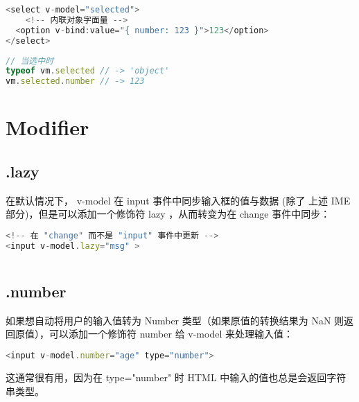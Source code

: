 \begin{lstlisting}[language=JavaScript]
<select v-model="selected">
    <!-- 内联对象字面量 -->
  <option v-bind:value="{ number: 123 }">123</option>
</select>
\end{lstlisting}



\begin{lstlisting}[language=JavaScript]
// 当选中时
typeof vm.selected // -> 'object'
vm.selected.number // -> 123
\end{lstlisting}



\section{Modifier}


\subsection{.lazy}

在默认情况下， v-model 在 input 事件中同步输入框的值与数据 (除了 上述 IME 部分)，但是可以添加一个修饰符 lazy ，从而转变为在 change 事件中同步：

\begin{lstlisting}[language=JavaScript]
<!-- 在 "change" 而不是 "input" 事件中更新 -->
<input v-model.lazy="msg" >
\end{lstlisting}





\begin{lstlisting}[language=JavaScript]

\end{lstlisting}


\subsection{.number}

如果想自动将用户的输入值转为 Number 类型（如果原值的转换结果为 NaN 则返回原值），可以添加一个修饰符 number 给 v-model 来处理输入值：

\begin{lstlisting}[language=JavaScript]
<input v-model.number="age" type="number">
\end{lstlisting}


这通常很有用，因为在 type="number" 时 HTML 中输入的值也总是会返回字符串类型。


\begin{lstlisting}[language=JavaScript]

\end{lstlisting}


